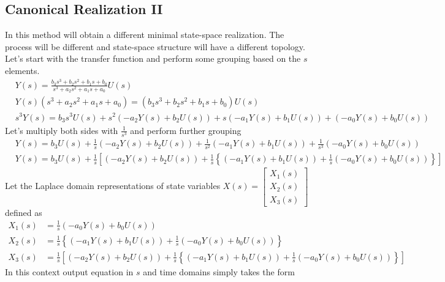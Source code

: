\documentclass[twoside]{article}
\begin{document}
\subsection{Canonical Realization II}

In this method will obtain a different minimal state-space realization. 
The process will be different and state-space structure will have a
different topology. Let's start with the transfer function 
and perform some grouping based on the $s$ elements.
%
\begin{align*}
&Y(s) = \frac{ b_3 s^3 + b_2 s^2  + b_1 s + b_0 }{ s^3 + a_2 s^2 + a_1 s + a_0} U(s)
\\
&Y(s) \left( s^3 + a_2 s^2 + a_1 s + a_0 \right) = \left( b_3 s^3 + b_2 s^2  + b_1 s + b_0 \right) U(s)
\\
&s^3 Y(s) = b_3 s^3 U(s) + s^2 \left( -a_2 Y(s) + b_2 U(s) \right) + s \left( -a_1 Y(s) + b_1 U(s) \right) + 
\left( -a_0 Y(s) + b_0 U(s) \right) 
\end{align*}
%
Let's multiply both sides with $\frac{1}{s^3}$ and perform further grouping
%
\begin{align*}
&Y(s) = b_3 U(s) + \frac{1}{s} \left( -a_2 Y(s) + b_2 U(s) \right) + \frac{1}{s^2}  \left( -a_1 Y(s) + b_1 U(s) \right) + 
\frac{1}{s^3} \left( -a_0 Y(s) + b_0 U(s) \right) 
\\
&Y(s) = b_3 U(s) + \frac{1}{s} \left[ \left( -a_2 Y(s) + b_2 U(s) \right) + \frac{1}{s}  \left\lbrace \left( -a_1 Y(s) + b_1 U(s) \right) + 
\frac{1}{s} \left( -a_0 Y(s) + b_0 U(s) \right) \right\rbrace \right]
\end{align*}
%
Let the Laplace domain representations of state variables $X(s) = \left[ \begin{array}{c} X_1(s) \\ X_2(s) \\ X_3(s) \end{array} \right]$ defined as 
%
\begin{align*}
X_1(s) &= \frac{1}{s} \left( -a_0 Y(s) + b_0 U(s) \right)
\\
X_2(s) &= \frac{1}{s}  \left\lbrace \left( -a_1 Y(s) + b_1 U(s) \right) + 
\frac{1}{s} \left( -a_0 Y(s) + b_0 U(s) \right) \right\rbrace
\\
X_3(s) &= \frac{1}{s} \left[ \left( -a_2 Y(s) + b_2 U(s) \right) + \frac{1}{s}  \left\lbrace \left( -a_1 Y(s) + b_1 U(s) \right) + 
\frac{1}{s} \left( -a_0 Y(s) + b_0 U(s) \right) \right\rbrace \right]
\end{align*}
%
In this context output equation in $s$ and time domains simply takes the form
\end{document}
